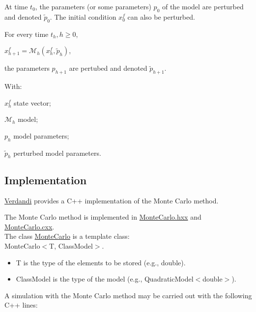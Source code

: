 \documentclass{tufte-book}
\begin{document}
\begin{DoxyEnumerate}
\item \-At time $t_0$, the parameters (or some parameters) $p_0$ of the model are perturbed and denoted $\widetilde p_0$. \-The initial condition $x^f_0$ can also be perturbed.
\item \-For every time $t_h, h \ge 0$,
\begin{DoxyItemize}
\item $x_{h+1}^f = \mathcal{M}_h(x_h^f, \widetilde p_h)$, \par

\item the parameters $p_{h+1}$ are pertubed and denoted $\widetilde p_{h+1}$.
\end{DoxyItemize}
\end{DoxyEnumerate}\-With\-: \par
 $x_h^f$ state vector; \par
 $\mathcal{M}_h$ model; \par
 $p_h$ model parameters; \par
 $\widetilde p_h$ perturbed model parameters.



\hypertarget{monte_carlo_mc_implementation}{}\subsection{\-Implementation}\label{monte_carlo_mc_implementation}


\hyperlink{namespace_verdandi}{\-Verdandi} provides a \-C++ implementation of the \-Monte \-Carlo method.

\-The \-Monte \-Carlo method is implemented in {\ttfamily \hyperlink{_monte_carlo_8hxx_source}{\-Monte\-Carlo.\-hxx}} and {\ttfamily \hyperlink{_monte_carlo_8cxx_source}{\-Monte\-Carlo.\-cxx}}.\\
 \-The class {\ttfamily  \hyperlink{class_verdandi_1_1_monte_carlo}{\-Monte\-Carlo}} is a template class\-:\\
  {\ttfamily \-Monte\-Carlo$<$\-T, Class\-Model$>$}.
  \begin{itemize}
   \item {\ttfamily \-T} is the type of the elements to be stored (e.\-g., {\ttfamily double}).
   \item {\ttfamily \-Class\-Model} is the type of the model (e.\-g., {\ttfamily \-Quadratic\-Model$<$double$>$}).
   \end{itemize}

\-A simulation with the \-Monte \-Carlo method may be carried out with the following \-C++ lines\-:
\end{document}
